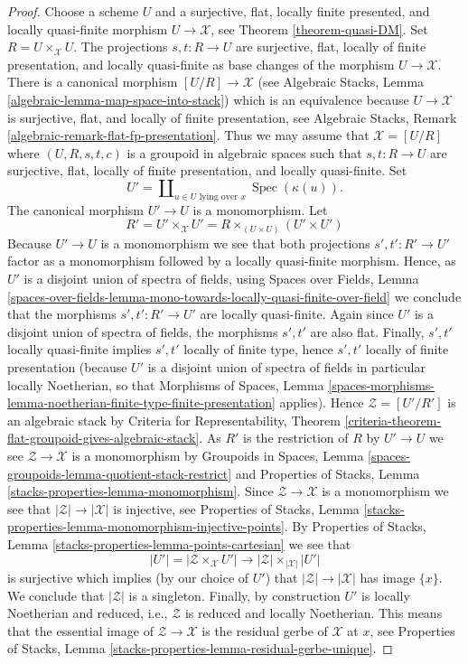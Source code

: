 \documentclass{stacks-project}
\theoremstyle{plain}
\theoremstyle{definition}
\theoremstyle{remark}
\numberwithin{equation}{subsection}
\def\Spec{\mathop{\mathrm{Spec}}}
\begin{document}
\begin{proof}
Choose a scheme $U$ and a surjective, flat, locally finite presented,
and locally quasi-finite morphism $U \to \mathcal{X}$, see
Theorem \ref{theorem-quasi-DM}.
Set $R = U \times_\mathcal{X} U$. The projections $s, t : R \to U$
are surjective, flat, locally of finite presentation, and
locally quasi-finite as base changes of the morphism $U \to \mathcal{X}$.
There is a canonical morphism $[U/R] \to \mathcal{X}$ (see
Algebraic Stacks, Lemma \ref{algebraic-lemma-map-space-into-stack})
which is an equivalence because $U \to \mathcal{X}$ is surjective, flat,
and locally of finite presentation, see
Algebraic Stacks, Remark \ref{algebraic-remark-flat-fp-presentation}.
Thus we may assume that $\mathcal{X} = [U/R]$ where
$(U, R, s, t, c)$ is a groupoid in algebraic spaces such that
$s, t : R \to U$ are surjective, flat, locally of finite presentation,
and locally quasi-finite. Set
$$
U' = \coprod\nolimits_{u \in U\text{ lying over }x} \Spec(\kappa(u)).
$$
The canonical morphism $U' \to U$ is a monomorphism. Let
$$
R' = U' \times_\mathcal{X} U' =
R \times_{(U \times U)} (U' \times U')
$$
Because $U' \to U$ is a monomorphism we see that both projections
$s', t' : R' \to U'$ factor as a monomorphism followed by a locally
quasi-finite morphism. Hence, as $U'$ is a disjoint union of spectra
of fields, using
Spaces over Fields, Lemma
\ref{spaces-over-fields-lemma-mono-towards-locally-quasi-finite-over-field}
we conclude that the morphisms $s', t' : R' \to U'$ are locally quasi-finite.
Again since $U'$ is a disjoint union of spectra of fields, the morphisms
$s', t'$ are also flat. Finally, $s', t'$ locally quasi-finite
implies $s', t'$ locally of finite type, hence $s', t'$ locally of finite
presentation (because $U'$ is a disjoint union of spectra of fields
in particular locally Noetherian, so that
Morphisms of Spaces, Lemma
\ref{spaces-morphisms-lemma-noetherian-finite-type-finite-presentation}
applies). Hence $\mathcal{Z} = [U'/R']$ is an algebraic stack by
Criteria for Representability, Theorem
\ref{criteria-theorem-flat-groupoid-gives-algebraic-stack}.
As $R'$ is the restriction of $R$ by $U' \to U$ we see
$\mathcal{Z} \to \mathcal{X}$ is a monomorphism by
Groupoids in Spaces, Lemma
\ref{spaces-groupoids-lemma-quotient-stack-restrict}
and
Properties of Stacks, Lemma \ref{stacks-properties-lemma-monomorphism}.
Since $\mathcal{Z} \to \mathcal{X}$ is a monomorphism we see that
$|\mathcal{Z}| \to |\mathcal{X}|$ is injective, see
Properties of Stacks, Lemma
\ref{stacks-properties-lemma-monomorphism-injective-points}.
By
Properties of Stacks, Lemma \ref{stacks-properties-lemma-points-cartesian}
we see that
$$
|U'| = |\mathcal{Z} \times_\mathcal{X} U'|
\longrightarrow
|\mathcal{Z}| \times_{|\mathcal{X}|} |U'|
$$
is surjective which implies (by our choice of $U'$) that
$|\mathcal{Z}| \to |\mathcal{X}|$ has image $\{x\}$.
We conclude that $|\mathcal{Z}|$ is a singleton.
Finally, by construction $U'$ is locally Noetherian and reduced, i.e.,
$\mathcal{Z}$ is reduced and locally Noetherian. This means that
the essential image of $\mathcal{Z} \to \mathcal{X}$
is the residual gerbe of $\mathcal{X}$ at $x$, see
Properties of Stacks, Lemma
\ref{stacks-properties-lemma-residual-gerbe-unique}.
\end{proof}
\end{document}
